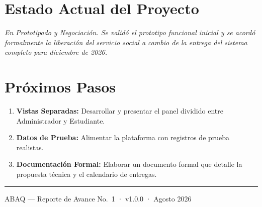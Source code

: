 \section{Estado Actual del Proyecto}\label{estado-actual-del-proyecto}

\emph{En Prototipado y Negociación. Se validó el prototipo funcional
inicial y se acordó formalmente la liberación del servicio social a
cambio de la entrega del sistema completo para diciembre de 2026.}

\section{Próximos Pasos}\label{pruxf3ximos-pasos}

\begin{enumerate}
\def\labelenumi{\arabic{enumi}.}
\tightlist
\item
  \textbf{Vistas Separadas:} Desarrollar y presentar el panel dividido
  entre Administrador y Estudiante.
\item
  \textbf{Datos de Prueba:} Alimentar la plataforma con registros de
  prueba realistas.
\item
  \textbf{Documentación Formal:} Elaborar un documento formal que
  detalle la propuesta técnica y el calendario de entregas.
\end{enumerate}

\begin{center}\rule{0.5\linewidth}{0.5pt}\end{center}

\hfill\break
ABAQ --- Reporte de Avance No.~1 · v1.0.0 · Agosto 2026
